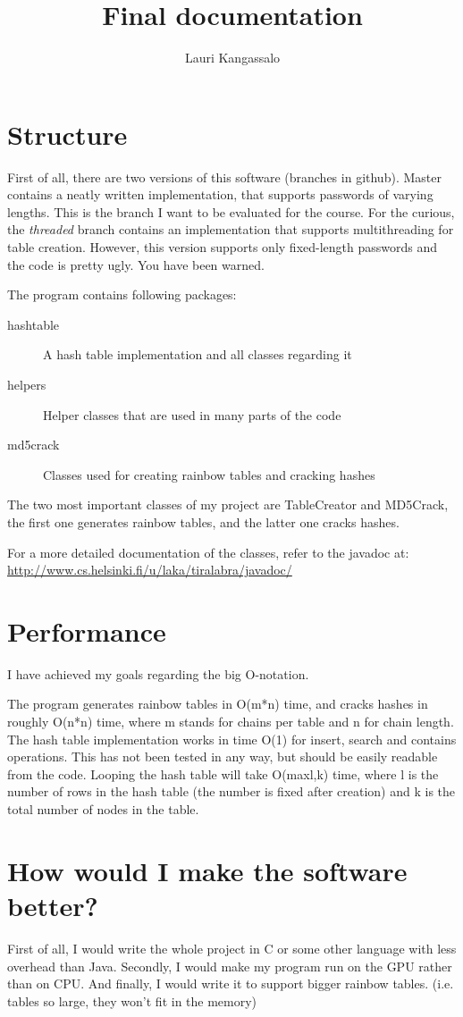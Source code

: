 \documentclass[a4paper, 11pt, finnish]{article}
\title{Final documentation}
\author{Lauri Kangassalo}
\begin{document}
  \maketitle
\section*{Structure}
First of all, there are two versions of this software (branches in github). Master contains a neatly written implementation, that supports passwords of varying lengths. This is the branch I want to be evaluated for the course. For the curious, the \emph{threaded} branch contains an implementation that supports multithreading for table creation. However, this version supports only fixed-length passwords and the code is pretty ugly. You have been warned.

The program contains following packages:
\begin{description}
\item[hashtable] A hash table implementation and all classes regarding it
\item[helpers] Helper classes that are used in many parts of the code
\item[md5crack] Classes used for creating rainbow tables and cracking hashes
\end{description}

The two most important classes of my project are TableCreator and MD5Crack, the first one generates rainbow tables, and the latter one cracks hashes.

For a more detailed documentation of the classes, refer to the javadoc at: \url{http://www.cs.helsinki.fi/u/laka/tiralabra/javadoc/}

\section*{Performance}
I have achieved my goals regarding the big O-notation.

The program generates rainbow tables in O(m*n) time, and cracks hashes in roughly O(n*n) time, where m stands for chains per table and n for chain length. The hash table implementation works in time O(1) for insert, search and contains operations. This has not been tested in any way, but should be easily readable from the code. Looping the hash table will take O(max{l,k}) time, where l is the number of rows in the hash table (the number is fixed after creation) and k is the total number of nodes in the table.

\section*{How would I make the software better?}
First of all, I would write the whole project in C or some other language with less overhead than Java. Secondly, I would make my program run on the GPU rather than on CPU. And finally, I would write it to support bigger rainbow tables. (i.e. tables so large, they won't fit in the memory)
\end{document}
